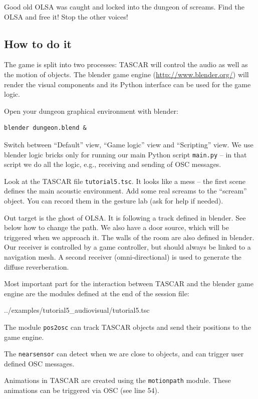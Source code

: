 \documentclass[11pt,a4paper,twoside]{article}
\begin{document}
Good old OLSA was caught and locked into the dungeon of screams. Find
the OLSA and free it! Stop the other voices!

\subsection*{How to do it}

The game is split into two processes: TASCAR will control the audio as
well as the motion of objects. The blender game engine
(\url{http://www.blender.org/}) will render the visual components and
its Python interface can be used for the game logic.

Open your dungeon graphical environment with blender:
\begin{verbatim}
blender dungeon.blend &
\end{verbatim}
Switch between ``Default'' view, ``Game logic'' view and ``Scripting''
view. We use blender logic bricks only for running our main Python
script \verb!main.py! -- in that script we do all the logic, e.g.,
receiving and sending of OSC messages.

Look at the TASCAR file \verb!tutorial5.tsc!. It looks like a mess --
the first scene defines the main acoustic environment. Add some real
screams to the ``scream'' object. You can record them in the gesture
lab (ask for help if needed).

Out target is the ghost of OLSA. It is following a track defined in
blender. See below how to change the path. We also have a door source,
which will be triggered when we approach it.  The walls of the room
are also defined in blender.  Our receiver is controlled by a game
controller, but should always be linked to a navigation mesh. A second
receiver (omni-directional) is used to generate the diffuse
reverberation.

Most important part for the interaction between TASCAR and the blender
game engine are the modules defined at the end of the session file:
\begin{lstinputlisting}[language=tsc,caption={},linerange=51-71,firstnumber=51]{../examples/tutorial5_audiovisual/tutorial5.tsc}
\end{lstinputlisting}
The module \verb!pos2osc! can track TASCAR objects and send their
positions to the game engine.

The \verb!nearsensor! can detect when we are close to objects, and can
trigger user defined OSC messages.

Animations in TASCAR are created using the \verb!motionpath!
module. These animations can be triggered via OSC (see line 54).
\end{document}
